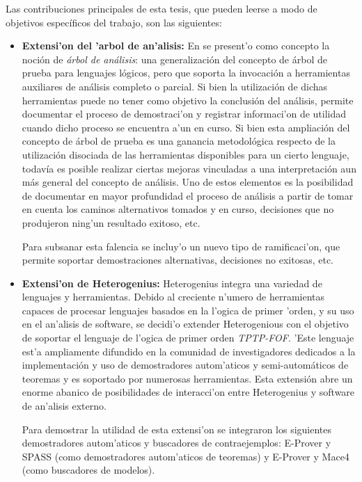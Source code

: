 Las contribuciones principales de esta tesis, que pueden leerse a modo de objetivos específicos del trabajo, son las siguientes:

\begin{itemize}
\item \textbf{Extensi'on del 'arbol de an'alisis:} En \cite{heterogenius} se present'o como concepto la noción de \emph{árbol de análisis}: una generalización del concepto de árbol de prueba para lenguajes lógicos, pero que soporta la invocación a herramientas auxiliares de análisis completo o parcial.
Si bien la utilización de dichas herramientas puede no tener como objetivo la conclusión del análisis, permite documentar el proceso de demostraci'on y registrar informaci'on de utilidad cuando dicho proceso se encuentra a'un en curso.
Si bien esta ampliación del concepto de árbol de prueba es una ganancia metodológica respecto de la utilización disociada de las herramientas disponibles para un cierto lenguaje, todavía es posible realizar ciertas mejoras vinculadas a una interpretación aun más general del concepto de análisis. Uno de estos elementos es la posibilidad de documentar en mayor profundidad el proceso de análisis a partir de tomar en cuenta los caminos alternativos tomados y en curso, decisiones que no produjeron ning'un resultado exitoso, etc.

Para subsanar esta falencia se incluy'o un nuevo tipo de ramificaci'on, que permite soportar demostraciones alternativas, decisiones no exitosas, etc.

\item \textbf{Extensi'on de Heterogenius:} Heterogenius integra una variedad de lenguajes y herramientas. Debido al creciente n'umero de herramientas capaces de procesar lenguajes basados en la l'ogica de primer 'orden, y su uso en el an'alisis de software, se decidi'o extender Heterogenious con el objetivo de soportar el lenguaje de l'ogica de primer orden \emph{TPTP-FOF}. 'Este lenguaje est'a ampliamente difundido en la comunidad de investigadores dedicados a la implementación y uso de demostradores autom'aticos y semi-automáticos de teoremas y es soportado por numerosas herramientas. 
Esta extensión abre un enorme abanico de posibilidades de interacci'on entre Heterogenius y software de an'alisis externo. 

Para demostrar la utilidad de esta extensi'on se integraron los siguientes demostradores autom'aticos y buscadores de contraejemplos: E-Prover y SPASS (como demostradores autom'aticos de teoremas) y E-Prover y Mace4 (como buscadores de modelos). 


\end{itemize}
